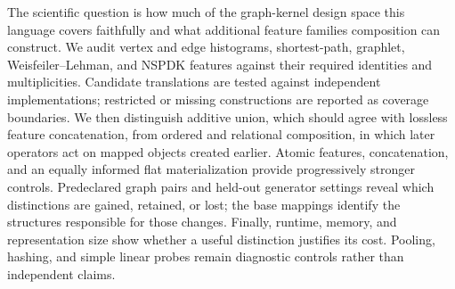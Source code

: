 The scientific question is how much of the graph-kernel design space this
language covers faithfully and what additional feature families composition can
construct. We audit vertex and edge histograms, shortest-path, graphlet,
Weisfeiler--Lehman, and NSPDK features against their required
identities and multiplicities. Candidate translations are tested against
independent implementations; restricted or missing constructions are reported
as coverage boundaries. We then distinguish additive union, which should
agree with lossless feature concatenation, from ordered and relational
composition, in which later operators act on mapped objects created earlier.
Atomic features, concatenation, and an equally informed flat materialization
provide progressively stronger controls. Predeclared graph pairs and held-out
generator settings reveal which distinctions are gained, retained, or lost;
the base mappings identify the structures responsible for those changes.
Finally, runtime, memory, and
representation size show whether a useful distinction justifies its cost.
Pooling, hashing, and simple linear probes remain diagnostic controls rather
than independent claims.
